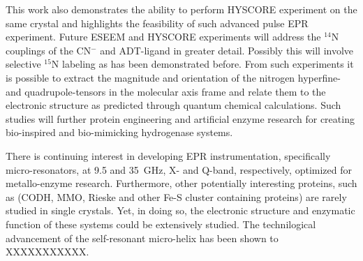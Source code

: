 This work also demonstrates the ability to perform HYSCORE experiment on the same crystal and highlights the feasibility of such advanced pulse EPR experiment. Future ESEEM and HYSCORE experiments will address the $^{14}$N couplings of the CN$^-$ and ADT-ligand in greater detail. Possibly this will involve selective $^{15}$N labeling as has been demonstrated before. \cite{Adamska2015, AdamskaBridgingAmine} From such experiments it is possible to extract the magnitude and orientation of the nitrogen hyperfine- and quadrupole-tensors in the molecular axis frame and relate them to the electronic structure as predicted through quantum chemical calculations. Such studies will further protein engineering and artificial enzyme research for creating bio-inspired and bio-mimicking hydrogenase systems. \cite{C7SE00582B}

There is continuing interest in developing EPR instrumentation, specifically micro-resonators, at 9.5 and 35~GHz, X- and Q-band, respectively, optimized for metallo-enzyme research. Furthermore, other potentially interesting proteins, such as (CODH\cite{C5CS00182J}, MMO\cite{Hoffman2014rev}, Rieske\cite{FERRARO2005175} and other Fe-S cluster containing proteins\cite{FeSClustersReview}) are rarely studied in single crystals. Yet, in doing so, the electronic structure and enzymatic function of these systems could be extensively studied. The technilogical advancement of the self-resonant micro-helix has been shown to XXXXXXXXXXX.


{\renewcommand{\bibsection}{\clearpage\section*{\bibname}\markboth{\bibname}{\bibname}}
\renewcommand{\bibname}{CHAPTER 6. REFERENCES}


}
